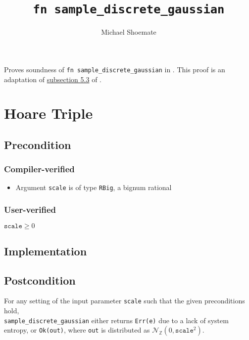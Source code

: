 \documentclass{article}
\title{\texttt{fn sample\_discrete\_gaussian}}
\author{Michael Shoemate}
\begin{document}
 
\maketitle 
 
Proves soundness of \texttt{fn sample\_discrete\_gaussian} in . 
This proof is an adaptation of \href{https://arxiv.org/pdf/2004.00010.pdf#subsection.5.3}{subsection 5.3} of \cite{CKS20}. 
 
\section{Hoare Triple} 
\subsection*{Precondition} 
\subsubsection*{Compiler-verified} 
\begin{itemize} 
    \item Argument \texttt{scale} is of type \texttt{RBig}, a bignum rational 
\end{itemize} 
 
\subsubsection*{User-verified} 
$\texttt{scale} \geq 0$ 
 
\subsection*{Implementation} 
 
 
\subsection*{Postcondition} 
\begin{theorem}
    \label{postcondition} 
    For any setting of the input parameter \texttt{scale} such that the given preconditions hold, \\ 
    \texttt{sample\_discrete\_gaussian} either returns \texttt{Err(e)} due to a lack of system entropy, 
    or \texttt{Ok(out)}, where \texttt{out} is distributed as $\mathcal{N}_\mathbb{Z}(0, \texttt{scale}^2)$. 
\end{theorem}
 
\end{document}
